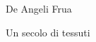 \begin{titlepage}
\vspace{4cm}
{\centering
  \fontsize{38pt}{1cm}
  \selectfont
De Angeli Frua
  \par
}
\vspace{2cm}
{\centering
  \fontsize{36pt}{1cm}
  \selectfont
  
Un secolo di tessuti
  \par
}

\end{titlepage}

\newpage



\newpage
